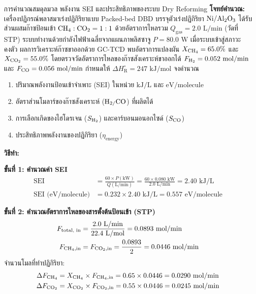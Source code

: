 \begin{examplebox}{การคำนวณสมดุลมวล พลังงาน SEI และประสิทธิภาพของระบบ Dry Reforming}
\textbf{โจทย์คำนวณ:} เครื่องปฏิกรณ์พลาสมาเร่งปฏิกิริยาแบบ Packed-bed DBD บรรจุตัวเร่งปฏิกิริยา $\ce{Ni/Al2O3}$ ได้รับส่วนผสมก๊าซป้อนเข้า $\ce{CH4}:\ce{CO2} = 1:1$ ด้วยอัตราการไหลรวม $Q_{\text{gas}} = 2.0 \text{ L/min}$ (วัดที่ STP) ระบบทำงานด้วยกำลังไฟฟ้าเฉลี่ยจากแผนภาพลิสซาจู $P = 80.0 \text{ W}$ เมื่อระบบเข้าสู่สภาวะคงตัว ผลการวิเคราะห์ก๊าซขาออกด้วย GC-TCD พบอัตราการแปลงผัน $X_{\ce{CH4}} = 65.0\%$ และ $X_{\ce{CO2}} = 55.0\%$ โดยตรวจวัดอัตราการไหลของก๊าซสังเคราะห์ขาออกได้ $F_{\ce{H2}} = 0.052 \text{ mol/min}$ และ $F_{\ce{CO}} = 0.056 \text{ mol/min}$ กำหนดให้ $\Delta H_{\text{R}}^\circ = 247 \text{ kJ/mol}$ จงคำนวณ
\begin{enumerate}
    \item ปริมาณพลังงานป้อนเข้าจำเพาะ (SEI) ในหน่วย $\text{kJ/L}$ และ $\text{eV/molecule}$
    \item อัตราส่วนโมลาร์ของก๊าซสังเคราะห์ ($\ce{H2/CO}$) ที่ผลิตได้
    \item การเลือกเกิดของไฮโดรเจน ($S_{\ce{H2}}$) และคาร์บอนมอนอกไซด์ ($S_{\ce{CO}}$)
    \item ประสิทธิภาพพลังงานของปฏิกิริยา ($\eta_{\text{energy}}$)
\end{enumerate}

\vspace{6pt}
\textbf{วิธีทำ:}

\textbf{ขั้นที่ 1: คำนวณค่า SEI}
\begin{align*}
    \text{SEI} &= \frac{60 \times P (\text{kW})}{Q (\text{L/min})} = \frac{60 \times 0.080 \text{ kW}}{2.0 \text{ L/min}} = 2.40 \text{ kJ/L} \\
    \text{SEI (eV/molecule)} &= 0.232 \times 2.40 \text{ kJ/L} = 0.557 \text{ eV/molecule}
\end{align*}

\textbf{ขั้นที่ 2: คำนวณอัตราการไหลของสารตั้งต้นป้อนเข้า (STP)}
\begin{align*}
    F_{\text{total, in}} &= \frac{2.0 \text{ L/min}}{22.4 \text{ L/mol}} = 0.0893 \text{ mol/min} \\
    F_{\ce{CH4}, \text{in}} &= F_{\ce{CO2}, \text{in}} = \frac{0.0893}{2} = 0.0446 \text{ mol/min}
\end{align*}
จำนวนโมลที่ทำปฏิกิริยา:
\begin{align*}
    \Delta F_{\ce{CH4}} &= X_{\ce{CH4}} \times F_{\ce{CH4}, \text{in}} = 0.65 \times 0.0446 = 0.0290 \text{ mol/min} \\
    \Delta F_{\ce{CO2}} &= X_{\ce{CO2}} \times F_{\ce{CO2}, \text{in}} = 0.55 \times 0.0446 = 0.0245 \text{ mol/min}
\end{align*}


\end{examplebox}
